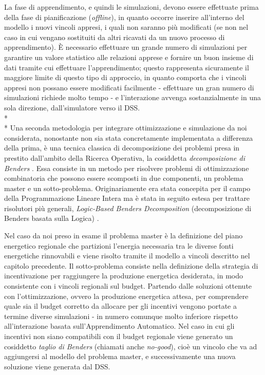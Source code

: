 La fase di apprendimento, e quindi le simulazioni, devono essere effettuate prima della fase di pianificazione (\emph{offline}), in quanto occorre inserire all'interno del modello i nuovi vincoli appresi, i quali non saranno più modificati (se non nel caso in cui vengano sostituiti da altri ricavati da un nuovo processo di apprendimento). \`E necessario effettuare un grande numero di simulazioni per garantire un valore statistico alle relazioni apprese e fornire un buon insieme di dati tramite cui effettuare l'apprendimento; questo rappresenta sicuramente il maggiore limite di questo tipo di approccio, in quanto comporta che i vincoli appresi non possano essere modificati facilmente - effettuare un gran numero di simulazioni richiede molto tempo - e l'interazione avvenga sostanzialmente in una sola direzione, dall'simulatore verso il DSS. 
\\*\\*
Una seconda metodologia per integrare ottimizzazione e simulazione da noi considerata, nonostante non sia stata concretamente implementata a differenza della prima, è una tecnica classica di decomposizione dei problemi presa in prestito dall'ambito della Ricerca Operativa, la cosiddetta \emph{decomposizione di Benders} \cite{bendersDec}. Essa consiste in un metodo per risolvere problemi di ottimizzazione combinatoria che possono essere scomposti in due componenti, un problema master e un sotto-problema. Originariamente era stata concepita per il campo della Programmazione Lineare Intera ma è stata in seguito estesa per trattare risolutori più generali, \emph{Logic-Based Benders Decomposition} (decomposizione di Benders basata sulla Logica) \cite{Hooker95logic-basedbenders}. 

Nel caso da noi preso in esame il problema master è la definizione del piano energetico regionale che partizioni l'energia necessaria tra le diverse fonti energetiche rinnovabili e viene risolto tramite il modello a vincoli descritto nel capitolo precedente. Il sotto-problema consiste nella definizione della strategia di incentivazione per raggiungere la produzione energetica desiderata, in modo consistente con i vincoli regionali sul budget. Partendo dalle soluzioni ottenute con l'ottimizzazione, ovvero la produzione energetica attesa, per comprendere quale sia il budget corretto da allocare per gli incentivi vengono portate a termine diverse simulazioni - in numero comunque molto inferiore rispetto all'interazione basata sull'Apprendimento Automatico. Nel caso in cui gli incentivi non siano compatibili con il budget regionale viene generato un cosiddetto \emph{taglio di Benders} (chiamati anche \emph{no-good}), cioè un vincolo che va ad aggiungersi al modello del problema master, e successivamente una nuova soluzione viene generata dal DSS. 

